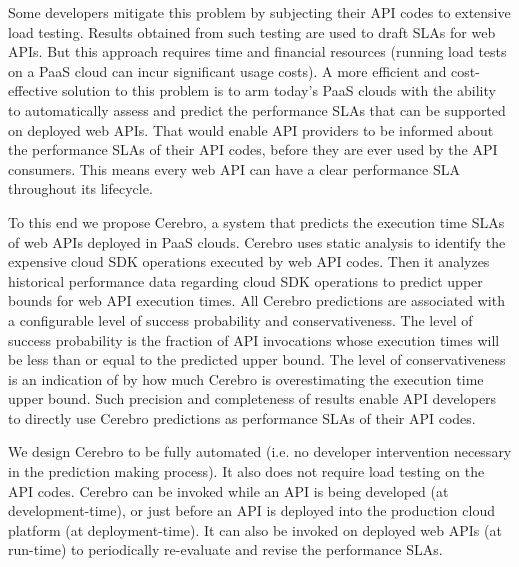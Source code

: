 Some developers mitigate this problem by subjecting their API codes to extensive load testing. Results obtained
from such testing are used to draft SLAs for web APIs.
But this approach requires time and financial resources (running load tests on a 
PaaS cloud can incur significant usage costs).
A more efficient and cost-effective solution to this problem is to arm today's PaaS clouds with the 
ability to automatically assess and
predict the performance SLAs that can be supported on deployed web APIs. 
That would enable API providers to be informed about the performance
SLAs of their API codes, before they are ever used by the API consumers. This means
every web API can have a clear performance SLA throughout its lifecycle.

To this end we propose Cerebro, a system that predicts the execution time SLAs of web APIs
deployed in PaaS clouds. Cerebro uses static analysis to identify the expensive cloud SDK operations
executed by web API codes. Then it analyzes historical performance data regarding cloud SDK
operations to predict upper bounds for web API execution times. All Cerebro predictions
are associated with a configurable level of success probability and conservativeness. The level of 
success probability is the fraction of API invocations whose execution times will be less than or equal to the
predicted upper bound. The level of conservativeness is an indication of by how much Cerebro
is overestimating the execution time upper bound. Such precision and completeness of results
enable API developers to directly use Cerebro predictions as performance SLAs of their
API codes. 

We design Cerebro to be fully automated (i.e. no developer intervention necessary in
the prediction making process). It also does not require load testing on the API codes. Cerebro can be
invoked while an API is being developed (at development-time), or just before an API is deployed
into the production cloud platform (at deployment-time). It can also be invoked on deployed
web APIs (at run-time) to periodically re-evaluate and revise the performance SLAs.

